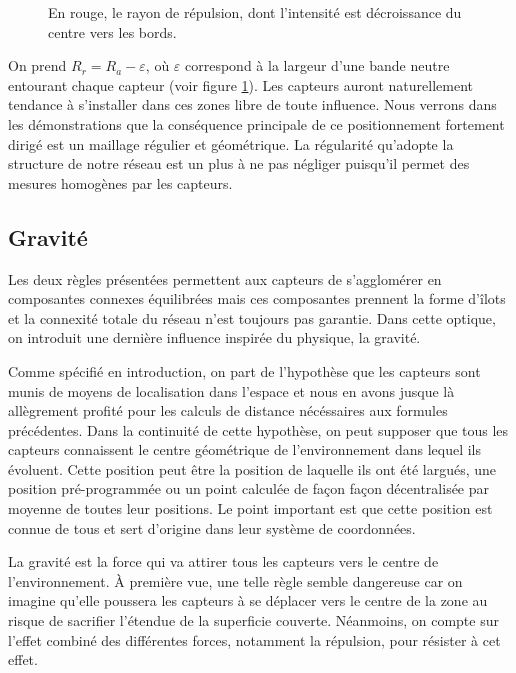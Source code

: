 \documentclass[10pt]{article}
\begin{document}
\begin{multicols}{2}
\begin{figure}[H]

  \centering

  

  \caption{En rouge, le rayon de répulsion, dont l'intensité est
    décroissance du centre vers les bords.}
  \label{repulsion}

\end{figure}

On prend $R_r = R_a - \varepsilon$, o\`u $\varepsilon$ correspond à la
largeur d'une bande neutre entourant chaque capteur (voir figure
\ref{repulsion}). Les capteurs auront naturellement tendance à
s'installer dans ces zones libre de toute influence. Nous verrons dans
les démonstrations que la conséquence principale de ce positionnement
fortement dirigé est un maillage régulier et géométrique. La
régularité qu'adopte la structure de notre réseau est un plus à ne pas
négliger puisqu'il permet des mesures homogènes par les capteurs.

\subsection*{Gravité}

Les deux règles présentées permettent aux capteurs de s'agglomérer en
composantes connexes équilibrées mais ces composantes prennent la
forme d'îlots et la connexité totale du réseau n'est toujours pas
garantie. Dans cette optique, on introduit une dernière influence
inspirée du physique, la gravité.

Comme spécifié en introduction, on part de l'hypothèse que les
capteurs sont munis de moyens de localisation dans l'espace et nous en
avons jusque là allègrement profité pour les calculs de distance
nécéssaires aux formules précédentes. Dans la continuité de cette
hypothèse, on peut supposer que tous les capteurs connaissent le
centre géométrique de l'environnement dans lequel ils évoluent. Cette
position peut être la position de laquelle ils ont été largués, une
position pré-programmée ou un point calculée de façon façon
décentralisée par moyenne de toutes leur positions. Le point important
est que cette position est connue de tous et sert d'origine dans leur
système de coordonnées.

La gravité est la force qui va attirer tous les capteurs vers le
centre de l'environnement. \`A première vue, une telle règle semble
dangereuse car on imagine qu'elle poussera les capteurs à se déplacer
vers le centre de la zone au risque de sacrifier l'étendue de la
superficie couverte. Néanmoins, on compte sur l'effet combiné des
différentes forces, notamment la répulsion, pour résister à cet effet.


\end{multicols}
\end{document}
